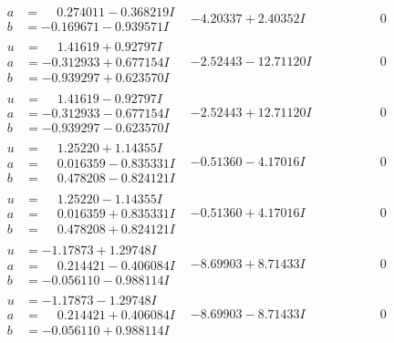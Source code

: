 \documentclass[1p]{elsarticle_modified}
\theoremstyle{definition}
\begin{document}
$$\begin{array}{c|c|c}
\begin{aligned}
a &= \phantom{-}0.274011 - 0.368219 I \\
b &= -0.169671 - 0.939571 I\end{aligned}
 & -4.20337 + 2.40352 I & \phantom{-0.000000 } 0 \\ \hline\begin{aligned}
u &= \phantom{-}1.41619 + 0.92797 I \\
a &= -0.312933 + 0.677154 I \\
b &= -0.939297 + 0.623570 I\end{aligned}
 & -2.52443 - 12.71120 I & \phantom{-0.000000 } 0 \\ \hline\begin{aligned}
u &= \phantom{-}1.41619 - 0.92797 I \\
a &= -0.312933 - 0.677154 I \\
b &= -0.939297 - 0.623570 I\end{aligned}
 & -2.52443 + 12.71120 I & \phantom{-0.000000 } 0 \\ \hline\begin{aligned}
u &= \phantom{-}1.25220 + 1.14355 I \\
a &= \phantom{-}0.016359 - 0.835331 I \\
b &= \phantom{-}0.478208 - 0.824121 I\end{aligned}
 & -0.51360 - 4.17016 I & \phantom{-0.000000 } 0 \\ \hline\begin{aligned}
u &= \phantom{-}1.25220 - 1.14355 I \\
a &= \phantom{-}0.016359 + 0.835331 I \\
b &= \phantom{-}0.478208 + 0.824121 I\end{aligned}
 & -0.51360 + 4.17016 I & \phantom{-0.000000 } 0 \\ \hline\begin{aligned}
u &= -1.17873 + 1.29748 I \\
a &= \phantom{-}0.214421 - 0.406084 I \\
b &= -0.056110 - 0.988114 I\end{aligned}
 & -8.69903 + 8.71433 I & \phantom{-0.000000 } 0 \\ \hline\begin{aligned}
u &= -1.17873 - 1.29748 I \\
a &= \phantom{-}0.214421 + 0.406084 I \\
b &= -0.056110 + 0.988114 I\end{aligned}
 & -8.69903 - 8.71433 I & \phantom{-0.000000 } 0 \\ \hline\begin{aligned}

\end{aligned}
\end{array}$$
\end{document}
